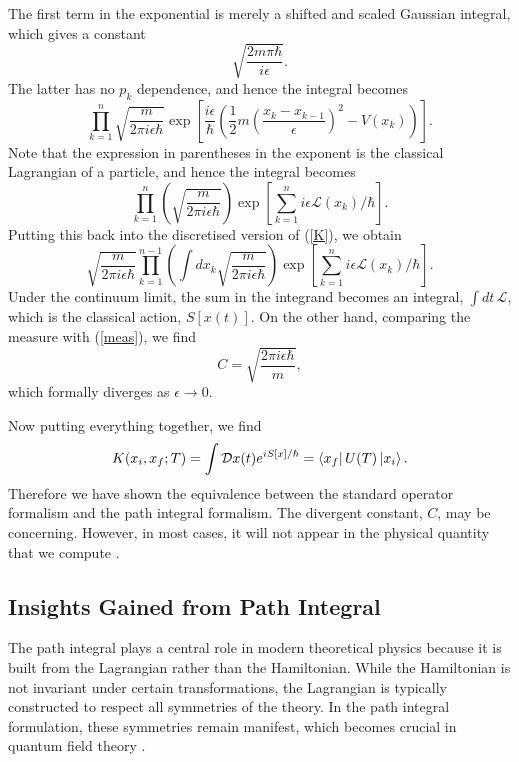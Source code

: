 \documentclass[12pt,a4paper]{article}
\begin{document}
The first term in the exponential is merely a shifted and scaled Gaussian integral, which gives a constant
\begin{equation}
    \sqrt{\frac{2m\pi\hbar}{i\epsilon}}.
\end{equation}
The latter has no $p_k$ dependence, and hence the integral becomes
\begin{equation}
     \prod_{k=1}^n\sqrt{\frac{m}{2\pi i\epsilon\hbar}}\exp\left[\frac{i\epsilon}{\hbar}\left(\frac{1}{2}m\left(\frac{x_k-x_{k-1}}{\epsilon}\right)^2 - V(x_k)\right)\right].
\end{equation}
Note that the expression in parentheses in the exponent is the classical Lagrangian of a particle, and hence the integral becomes
\begin{equation}
    \prod_{k=1}^n\left(\sqrt{\frac{m}{2\pi i\epsilon\hbar}}\right)\exp\left[\sum_{k=1}^ni\epsilon\mathcal{L}(x_k)/\hbar\right].
\end{equation}
Putting this back into the discretised version of (\ref{K}), we obtain
\begin{equation}
    \sqrt{\frac{m}{2\pi i\epsilon\hbar}}\prod_{k=1}^{n-1}\left(\int dx_k\sqrt{\frac{m}{2\pi i\epsilon\hbar}}\right)\exp\left[\sum_{k=1}^ni\epsilon\mathcal{L}(x_k)/\hbar\right].
\end{equation}
Under the continuum limit, the sum in the integrand becomes an integral, $\int dt \,\mathcal{L}$, which is the classical action,  $S[x(t)]$. On the other hand, comparing the measure with (\ref{meas}), we find
\begin{equation}
    C  = \sqrt{\frac{2\pi i\epsilon\hbar}{m}},
\end{equation}
which formally diverges as $\epsilon \to 0$.

Now putting everything together, we find
\begin{equation}
    K(x_i,x_f;T) = \int \mathcal{D}x(t) e^{iS[x]/\hbar} = \bra{x_f}U(T)\ket{x_i}.
\end{equation}
Therefore we have shown the equivalence between the standard operator formalism and the path integral formalism.
The divergent constant, $C$, may be concerning. However, in most cases, it will not appear in the physical quantity that we compute \cite{TongQM, Feynman1948, Peskin, Schwartz}.

\subsection{Insights Gained from Path Integral}
The path integral plays a central role in modern theoretical physics because it is built from the Lagrangian rather than the Hamiltonian. While the Hamiltonian is not invariant under certain transformations, the Lagrangian is typically constructed to respect all symmetries of the theory. In the path integral formulation, these symmetries remain manifest, which becomes crucial in quantum field theory \cite{Peskin}.
\end{document}
